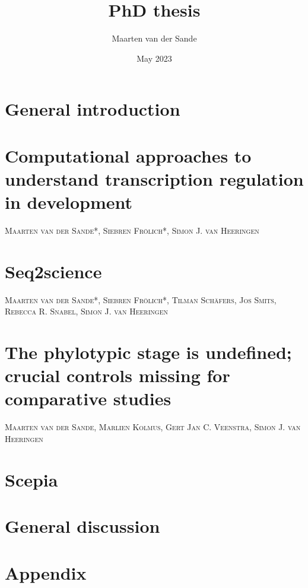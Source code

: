 \documentclass{book}
\title{PhD thesis}
\author{Maarten van der Sande}
\date{May 2023}
\makeatletter
\newcommand{\chapterauthor}[1]{%
  {\parindent0pt\vspace*{-25pt}%
  \linespread{1.1}\large\scshape#1%
  \par\nobreak\vspace*{35pt}}
  \@afterheading%
}
\makeatother
\begin{document}
\maketitle

\tableofcontents

\chapter{General introduction}



\chapter{Computational approaches to understand transcription regulation in development}
\chapterauthor{Maarten van der Sande*, Siebren Fr{\"o}lich*, Simon J. van Heeringen}


\chapter{Seq2science}
\chapterauthor{Maarten van der Sande*, Siebren Fr{\"o}lich*, Tilman Sch{\"a}fers, Jos Smits, Rebecca R. Snabel, Simon J. van Heeringen}


\chapter{The phylotypic stage is undefined; crucial controls missing for comparative studies}
\chapterauthor{Maarten van der Sande, Marlien Kolmus, Gert Jan C. Veenstra, Simon J. van Heeringen}


\chapter{Scepia}

\chapter{General discussion}


\chapter{Appendix}



\end{document}
